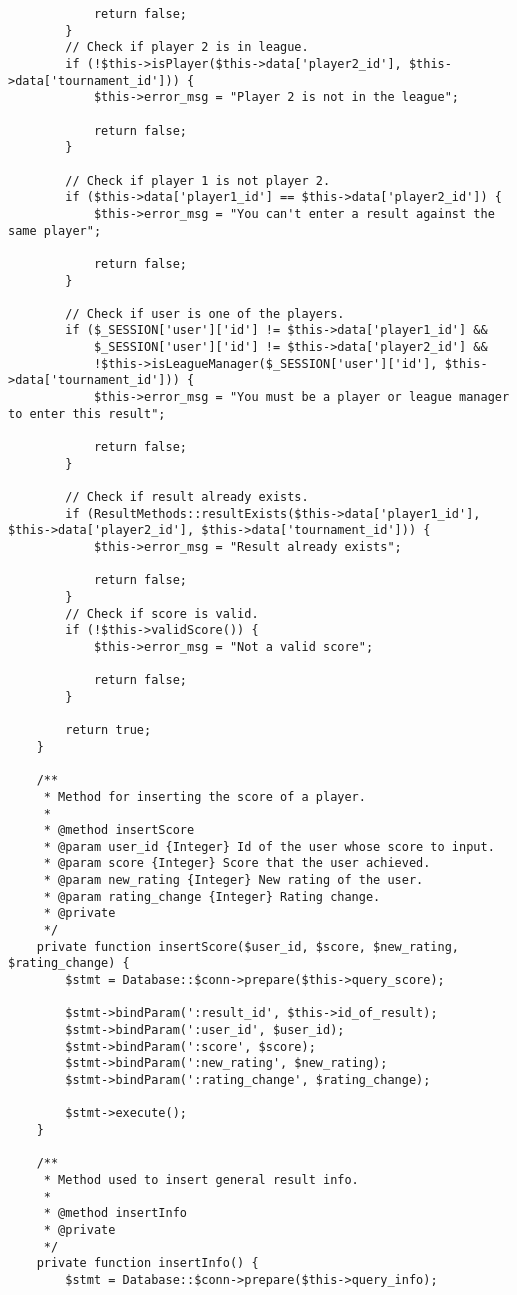 {\begin{lstlisting}
			return false;
		}		
		// Check if player 2 is in league.
		if (!$this->isPlayer($this->data['player2_id'], $this->data['tournament_id'])) {
			$this->error_msg = "Player 2 is not in the league";

			return false;
		}

		// Check if player 1 is not player 2.
		if ($this->data['player1_id'] == $this->data['player2_id']) {
			$this->error_msg = "You can't enter a result against the same player";

			return false;
		}

		// Check if user is one of the players.
		if ($_SESSION['user']['id'] != $this->data['player1_id'] &&
			$_SESSION['user']['id'] != $this->data['player2_id'] &&
			!$this->isLeagueManager($_SESSION['user']['id'], $this->data['tournament_id'])) {
			$this->error_msg = "You must be a player or league manager to enter this result";

			return false;
		}
		
		// Check if result already exists.
		if (ResultMethods::resultExists($this->data['player1_id'], $this->data['player2_id'], $this->data['tournament_id'])) {
			$this->error_msg = "Result already exists";

			return false;
		}
		// Check if score is valid.
		if (!$this->validScore()) {
			$this->error_msg = "Not a valid score";

			return false;
		}

		return true;
	}

	/**
	 * Method for inserting the score of a player.
	 *
	 * @method insertScore
	 * @param user_id {Integer} Id of the user whose score to input.
	 * @param score {Integer} Score that the user achieved.
	 * @param new_rating {Integer} New rating of the user.
	 * @param rating_change {Integer} Rating change.
	 * @private
	 */
	private function insertScore($user_id, $score, $new_rating, $rating_change) {
		$stmt = Database::$conn->prepare($this->query_score);

		$stmt->bindParam(':result_id', $this->id_of_result);
		$stmt->bindParam(':user_id', $user_id);
		$stmt->bindParam(':score', $score);
		$stmt->bindParam(':new_rating', $new_rating);
		$stmt->bindParam(':rating_change', $rating_change);

		$stmt->execute();
	}

	/**
	 * Method used to insert general result info.
	 *
	 * @method insertInfo
	 * @private
	 */
	private function insertInfo() {
		$stmt = Database::$conn->prepare($this->query_info);


\end{lstlisting}}
